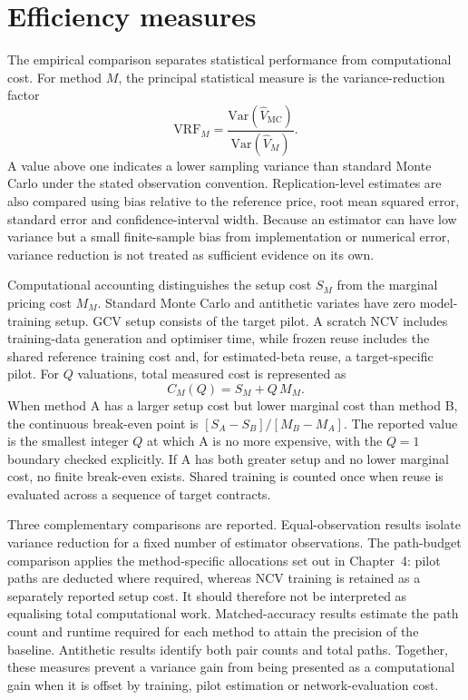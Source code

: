 \section{Efficiency measures}

The empirical comparison separates statistical performance from computational cost. For method $M$, the principal statistical measure is the variance-reduction factor
\begin{equation}
\mathrm{VRF}_M = \frac{\mathrm{Var}(\hat{V}_{\mathrm{MC}})}{\mathrm{Var}(\hat{V}_M)}.
\label{eq:vrf}
\end{equation}
A value above one indicates a lower sampling variance than standard Monte Carlo under the stated observation convention. Replication-level estimates are also compared using bias relative to the reference price, root mean squared error, standard error and confidence-interval width. Because an estimator can have low variance but a small finite-sample bias from implementation or numerical error, variance reduction is not treated as sufficient evidence on its own.

Computational accounting distinguishes the setup cost $S_M$ from the marginal pricing cost $M_M$. Standard Monte Carlo and antithetic variates have zero model-training setup. GCV setup consists of the target pilot. A scratch NCV includes training-data generation and optimiser time, while frozen reuse includes the shared reference training cost and, for estimated-beta reuse, a target-specific pilot. For $Q$ valuations, total measured cost is represented as
\begin{equation}
C_M(Q) = S_M + Q\,M_M.
\label{eq:total_cost}
\end{equation}
When method A has a larger setup cost but lower marginal cost than method B, the continuous break-even point is $[S_A - S_B]/[M_B - M_A]$. The reported value is the smallest integer $Q$ at which A is no more expensive, with the $Q = 1$ boundary checked explicitly. If A has both greater setup and no lower marginal cost, no finite break-even exists. Shared training is counted once when reuse is evaluated across a sequence of target contracts.

Three complementary comparisons are reported. Equal-observation results isolate variance reduction for a fixed number of estimator observations. The path-budget comparison applies the method-specific allocations set out in Chapter~4: pilot paths are deducted where required, whereas NCV training is retained as a separately reported setup cost. It should therefore not be interpreted as equalising total computational work. Matched-accuracy results estimate the path count and runtime required for each method to attain the precision of the baseline. Antithetic results identify both pair counts and total paths. Together, these measures prevent a variance gain from being presented as a computational gain when it is offset by training, pilot estimation or network-evaluation cost.

